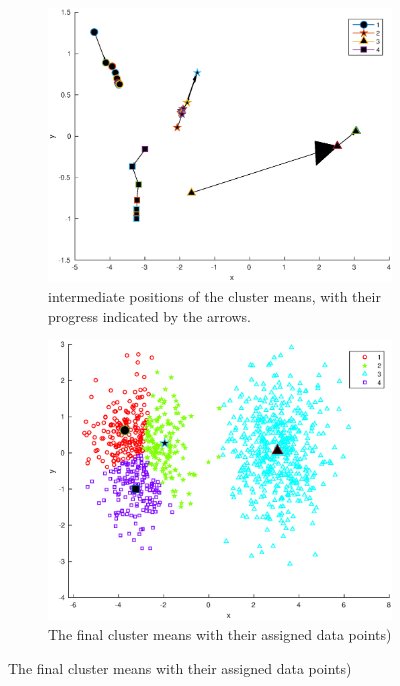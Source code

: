 \documentclass[10pt]{article}
\begin{document}
\begin{figure}[H]
  \centering
  \caption{Results for k=4}
  \begin{subfigure}[b]{.45\textwidth}
    \includegraphics[width=\columnwidth]{Fig1_k4.eps}
    \caption{intermediate positions of the cluster means, 
    with their progress indicated by the arrows.}
  \end{subfigure}
  \quad
  \begin{subfigure}[b]{.45\textwidth}
    \includegraphics[width=\columnwidth]{Fig2_k4.eps}
    \caption{The final cluster means with their assigned data points)}
  \end{subfigure}
  \label{fig1.2}
\end{figure}
\end{document}
